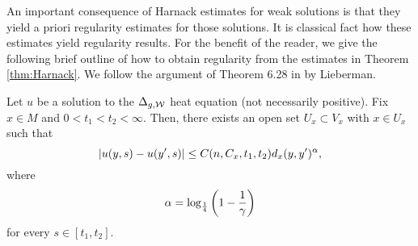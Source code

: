 \documentclass[a4paper, 12pt]{amsart}
\begin{document}
An important consequence of Harnack estimates for weak 
solutions is that they yield a priori regularity estimates
for those solutions. It is classical fact how these estimates
yield regularity results. For the benefit of the reader, 
we give the following brief outline of how to obtain
regularity from the estimates in Theorem \ref{thm:Harnack}.
We follow the argument of Theorem 6.28 in 
\cite{Lieberman} by Lieberman.

\begin{prop}
Let $u$ be a solution to the $\Delta_{g,\mathcal{W}}$
heat equation (not necessarily positive).
Fix $x \in M$ and $0 < t_1 < t_2 < \infty$.
Then, there exists an open set $U_x \subset V_x$ 
with $x \in U_x$
such that 
$$ |u(y,s) - u(y',s)| \leq C(n, C_x, t_1, t_2) d_x(y, y')^\alpha,$$
where 
$$ \alpha = \log_{\frac{1}{4}}\left(1 - \frac{1}{\gamma}\right)$$
for every $s \in [t_1, t_2]$.
\end{prop}
\end{document}
